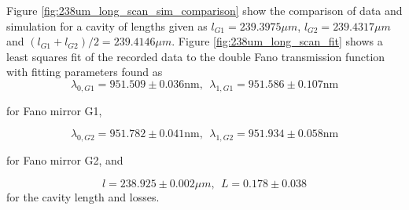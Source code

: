 Figure \ref{fig:238um_long_scan_sim_comparison} show the comparison of data and simulation for a cavity of lengths given as $l_{G1} = 239.3975 \mu m$, $l_{G2} = 239.4317 \mu m$ and $(l_{G1} + l_{G2})/2 = 239.4146 \mu m$. Figure \ref{fig:238um_long_scan_fit} shows a least squares fit of the recorded data to the double Fano transmission function with fitting parameters found as 
\begin{equation}
    \lambda_{0,G1} = 951.509 \pm 0.036 \text{nm}, \:\: \lambda_{1,G1} = 951.586 \pm 0.107 \text{nm}
\end{equation}

for Fano mirror G1,

\begin{equation}
    \lambda_{0,G2} = 951.782 \pm 0.041 \text{nm}, \:\: \lambda_{1,G2} = 951.934 \pm 0.058 \text{nm}
\end{equation}

for Fano mirror G2, and

\begin{equation}
    l = 238.925 \pm 0.002 \mu m, \:\: L = 0.178 \pm 0.038
\end{equation}
for the cavity length and losses.

